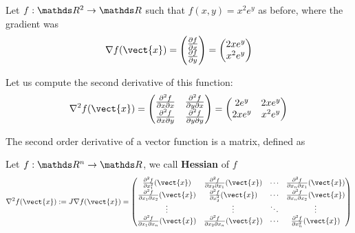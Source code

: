 \documentclass[computationalMathematics.tex]{subfiles}
\begin{document}
\begin{example}
Let $f:\R^2 \to \R$ such that $f(x, y) = x^2 e^y$ as before, where the gradient was
\[
  \nabla f(\vect{x})
  =
  \begin{pmatrix}
    \frac{\partial f}{\partial x}\\
    \frac{\partial f}{\partial y} 
  \end{pmatrix}
  =
  \begin{pmatrix}
    2x e^y\\
    x^2 e^y
  \end{pmatrix}
\]

Let us compute the second derivative of this function:
\[
  \nabla^2 f(\vect{x})
  =
  \begin{pmatrix}
    \frac{\partial^2 f}{\partial x \partial x} & \frac{\partial^2 f}{\partial y \partial x}\\

    \frac{\partial^2 f}{\partial x \partial  y} & \frac{\partial^2 f}{\partial y \partial y}\\

  \end{pmatrix}
  =
  \begin{pmatrix}
    2 e^y & 2x e^y\\
    2x e^y & x^2 e^y\\
  \end{pmatrix}
\]
\end{example}

\noindent The second order derivative of a vector function is a matrix, defined as 

\begin{definition}[Hessian]
  Let $f: \R^n \to \R$, we call \textbf{Hessian} of $f$
  \[
  \nabla^2 f(\vect{x}) := J \nabla f(\vect{x}) =
  \begin{pmatrix}
   \frac{\partial^2 f}{\partial x_1^2}(\vect{x}) &
   \frac{\partial^2 f}{\partial x_2 \partial x_1}(\vect{x}) & \cdots &
   \frac{\partial^2 f}{\partial x_n \partial x_1}(\vect{x})\\
   \frac{\partial^2 f}{\partial x_1 \partial x_2}(\vect{x}) &
   \frac{\partial^2 f}{\partial x_2^2}(\vect{x}) & \cdots &
   \frac{\partial^2 f}{\partial x_n \partial x_2}(\vect{x}) \\
   \vdots & \vdots & \ddots & \vdots \\
   \frac{\partial^2 f}{\partial x_1 \partial x_n}(\vect{x}) &
   \frac{\partial^2 f}{\partial x_2 \partial x_n}(\vect{x}) & \cdots &
   \frac{\partial^2 f}{\partial x_n^2}(\vect{x})
  \end{pmatrix}
\]
\end{definition}
\end{document}
